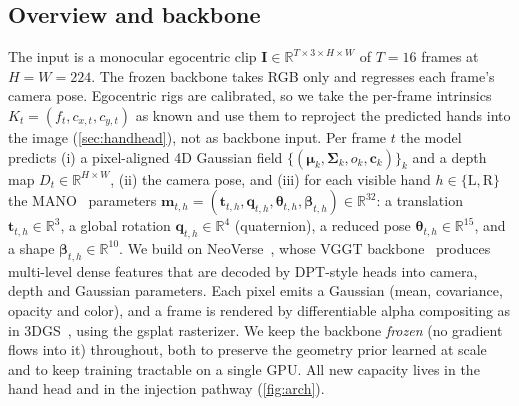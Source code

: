 \documentclass[10pt,twocolumn,letterpaper]{article}
\begin{document}
\subsection{Overview and backbone}
\label{sec:overview}
The input is a monocular egocentric clip $\mathbf{I}\in\mathbb{R}^{T\times 3\times
H\times W}$ of $T{=}16$ frames at $H{=}W{=}224$. The frozen backbone takes RGB only
and regresses each frame's camera pose. Egocentric rigs are calibrated, so we take
the per-frame intrinsics $K_t=(f_t,c_{x,t},c_{y,t})$ as known and use them to
reproject the predicted hands into the image (\cref{sec:handhead}), not as backbone
input. Per frame $t$ the model predicts (i) a pixel-aligned
4D Gaussian field $\{(\boldsymbol{\mu}_k,\boldsymbol{\Sigma}_k,o_k,\mathbf{c}_k)\}_k$
and a depth map $D_t\in\mathbb{R}^{H\times W}$, (ii) the camera pose, and (iii) for
each visible hand $h\in\{\mathrm{L},\mathrm{R}\}$ the MANO~\cite{romero2017mano}
parameters $\mathbf{m}_{t,h}=(\mathbf{t}_{t,h},\mathbf{q}_{t,h},
\boldsymbol{\theta}_{t,h},\boldsymbol{\beta}_{t,h})\in\mathbb{R}^{32}$: a
translation $\mathbf{t}_{t,h}\in\mathbb{R}^{3}$, a global rotation
$\mathbf{q}_{t,h}\in\mathbb{R}^{4}$ (quaternion), a reduced pose
$\boldsymbol{\theta}_{t,h}\in\mathbb{R}^{15}$, and a shape
$\boldsymbol{\beta}_{t,h}\in\mathbb{R}^{10}$. We build on
NeoVerse~\cite{yang2026neoverse}, whose VGGT backbone~\cite{wang2025vggt} produces
multi-level dense features that are decoded by DPT-style heads into camera, depth
and Gaussian parameters. Each pixel emits a Gaussian (mean, covariance, opacity
and color), and a frame is rendered by differentiable alpha compositing as in
3DGS~\cite{kerbl20233d}, using the gsplat rasterizer. We keep the backbone
\emph{frozen} (no gradient flows into it) throughout, both to preserve the
geometry prior learned at scale and to keep training tractable on a single GPU.
All new capacity lives in the hand head and in the injection pathway
(\cref{fig:arch}).
\end{document}
